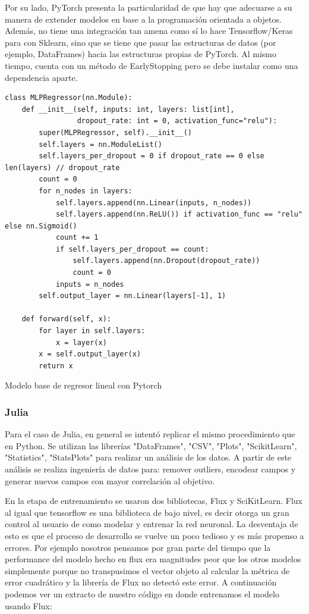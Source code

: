 \documentclass[11pt]{article}
\let\Oldsubsubsection\subsubsection
\renewcommand{\subsubsection}{\FloatBarrier\Oldsubsubsection}
\begin{document}
Por su lado, PyTorch presenta la particularidad de que hay que adecuarse a su manera de extender modelos en base a la programación orientada a objetos. Además, no tiene una integración tan amena como sí lo hace Tensorflow/Keras para con Sklearn, sino que se tiene que pasar las estructuras de datos (por ejemplo, DataFrames) hacia las estructuras propias de PyTorch. Al mismo tiempo, cuenta con un método de EarlyStopping pero se debe instalar como una dependencia aparte.

\begin{listing}[H]
\begin{verbatim}
class MLPRegressor(nn.Module):
    def __init__(self, inputs: int, layers: list[int],
                 dropout_rate: int = 0, activation_func="relu"):
        super(MLPRegressor, self).__init__()
        self.layers = nn.ModuleList()
        self.layers_per_dropout = 0 if dropout_rate == 0 else len(layers) // dropout_rate
        count = 0
        for n_nodes in layers:
            self.layers.append(nn.Linear(inputs, n_nodes))
            self.layers.append(nn.ReLU()) if activation_func == "relu" else nn.Sigmoid()
            count += 1
            if self.layers_per_dropout == count:
                self.layers.append(nn.Dropout(dropout_rate))
                count = 0
            inputs = n_nodes
        self.output_layer = nn.Linear(layers[-1], 1)
        
    def forward(self, x):
        for layer in self.layers:
            x = layer(x)
        x = self.output_layer(x)
        return x
\end{verbatim}
\caption{Modelo base de regresor lineal con Pytorch}
\end{listing}

\subsubsection{Julia}

Para el caso de Julia, en general se intentó replicar el mismo procedimiento que en Python.
Se utilizan las librerías "DataFrames", "CSV", "Plots", "ScikitLearn", "Statistics", "StatsPlots" para realizar un análisis de los datos. A partir de este análisis se realiza ingeniería de datos para: remover outliers, encodear campos y generar nuevos campos con mayor correlación al objetivo.

En la etapa de entrenamiento se usaron dos bibliotecas, Flux y SciKitLearn. Flux al igual que tensorflow es una biblioteca de bajo nivel, es decir otorga un gran control al usuario de como modelar y entrenar la red neuronal. La desventaja de esto es que el proceso de desarrollo se vuelve un poco tedioso y es más propenso a errores. Por ejemplo nosotros pensamos por gran parte del tiempo que la performance del modelo hecho en flux era magnitudes peor que los otros modelos simplemente porque no transpusimos el vector objeto al calcular la métrica de error cuadrático y la librería de Flux no detectó este error. A continuación podemos ver un extracto de nuestro código en donde entrenamos el modelo usando Flux:
\end{document}
